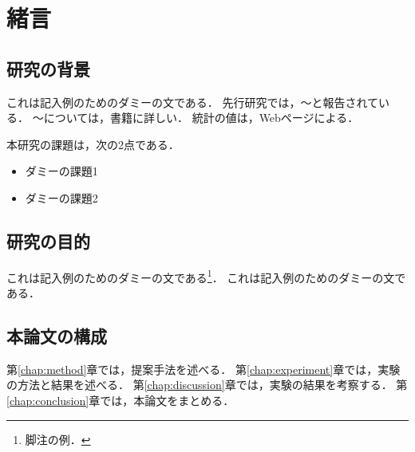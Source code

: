 \chapter{緒言}
\label{chap:introduction}

\section{研究の背景}
\label{sec:background}
これは記入例のためのダミーの文である．
先行研究では，〜と報告されている\cite{example2025}．
〜については，書籍\cite{examplebook}に詳しい．
統計の値は，Webページ\cite{exampleweb}による．

本研究の課題は，次の2点である．
\begin{itemize}
  \item ダミーの課題1
  \item ダミーの課題2
\end{itemize}

\section{研究の目的}
\label{sec:purpose}
これは記入例のためのダミーの文である\footnote{脚注の例．}．
これは記入例のためのダミーの文である．

\section{本論文の構成}
第\ref{chap:method}章では，提案手法を述べる．
第\ref{chap:experiment}章では，実験の方法と結果を述べる．
第\ref{chap:discussion}章では，実験の結果を考察する．
第\ref{chap:conclusion}章では，本論文をまとめる．
